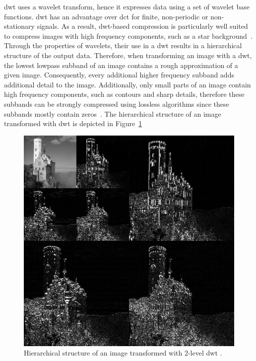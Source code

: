 \Gls{dwt} uses a wavelet transform, hence it expresses data using a set of wavelet base functions. \gls{dwt} has an advantage over \gls{dct} for finite, non-periodic or non-stationary signals. As a result, \gls{dwt}-based compression is particularly well suited to compress images with high frequency components, such as a star background~\cite{Bocharova2009CompressionMultimedia}. Through the properties of wavelets, their use in a \gls{dwt} results in a hierarchical structure of the output data. Therefore, when transforming an image with a \gls{dwt}, the lowest lowpass subband of an image contains a rough approximation of a given image. Consequently, every additional higher frequency subband adds additional detail to the image. Additionally, only small parts of an image contain high frequency components, such as contours and sharp details, therefore these subbands can be strongly compressed using lossless algorithms since these subbands mostly contain zeros~\cite{Bocharova2009CompressionMultimedia}. The hierarchical structure of an image transformed with \gls{dwt} is depicted in Figure~\ref{fig:jp2_hierarchy}
\begin{figure}[htb]
    \centering
        \includegraphics[width=.7\textwidth]{doc/thesis/0_figures/jp2_jpeg/Jpeg2000_2-level_wavelet_transform-lichtenstein.png}
        \caption{Hierarchical structure of an image transformed with 2-level \gls{dwt} \cite{Commons2019File:Jpeg2000Repository}.}
        \label{fig:jp2_hierarchy}
\end{figure}

